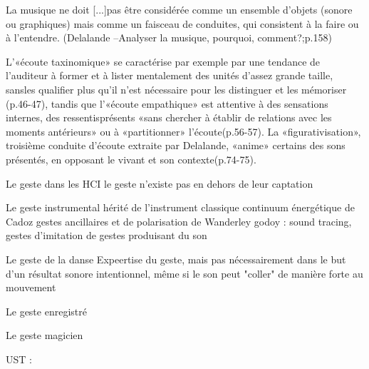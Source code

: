 La musique ne doit [...]pas être considérée comme un ensemble d’objets (sonore ou graphiques) mais comme un faisceau de conduites, qui consistent à la faire ou à l’entendre. (Delalande –Analyser la musique, pourquoi, comment?;p.158) 
 
L’«écoute taxinomique» se caractérise par exemple par une tendance de l’auditeur à former et à lister mentalement des unités d’assez grande taille, sansles qualifier plus qu’il n’est nécessaire pour les distinguer et les mémoriser (p.46-47), tandis que l’«écoute empathique» est attentive à des sensations internes, des ressentisprésents «sans chercher à  établir de relations avec les moments antérieurs» ou à «partitionner» l’écoute(p.56-57). La «figurativisation», troisième conduite d’écoute extraite par Delalande, «anime» certains des sons présentés, en opposant le vivant et son contexte(p.74-75).



Le geste dans les HCI
	le geste n'existe pas en dehors de leur captation  

Le geste instrumental hérité de l'instrument classique
	continuum énergétique de Cadoz
	gestes ancillaires et de polarisation de Wanderley
	godoy : sound tracing, gestes d'imitation de gestes produisant du son


Le geste de la danse
	Expeertise du geste, mais pas nécessairement dans le but d'un résultat sonore intentionnel, même si le son peut "coller" de manière forte au mouvement


Le geste enregistré


Le geste magicien

\cite{cadoz_synthese_1981}

\cite{gibet_codage_1987}

\cite{cadoz_instrumental_1988}

\cite{delalande_geste_1988}

UST : \cite{delalande_les_1996}
